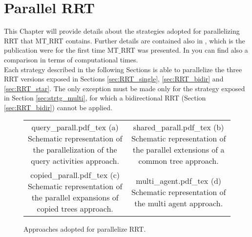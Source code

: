 \chapter{Parallel RRT}
\label{chap:parallel_RRT}

This Chapter will provide details about the strategies adopted for parallelizing RRT that MT$\_$RRT contains. Further details are contained also in \cite{MT_RRT}, which is the publication were for the first time MT$\_$RRT was presented. In \cite{MT_RRT} you can find also a comparison in terms of computational times.
\\
Each strategy described in the following Sections is able to parallelize the three RRT versions exposed in Sections \ref{sec:RRT_single}, \ref{sec:RRT_bidir} and \ref{sec:RRT_star}. The only exception must be made only for the strategy exposed in Section \ref{sec:strtg_multi}, for which a bidirectional RRT (Section \ref{sec:RRT_bidir}) cannot be applied.

 \begin{figure}
\begin{tabular}{cc}
\begin{minipage}[t]{0.49\textwidth}
 \def\svgwidth{0.69 \columnwidth}
 {query_parall.pdf_tex} 
 (a) Schematic representation of the parallelization of the query activities approach.
\end{minipage}
 &  
\begin{minipage}[t]{0.49\textwidth}
 \def\svgwidth{0.79 \columnwidth}
 {shared_parall.pdf_tex} 
 (b) Schematic representation of the parallel extensions of a common tree approach.
\end{minipage}
 \\
\begin{minipage}[t]{0.49\textwidth}
 \def\svgwidth{0.59 \columnwidth}
 {copied_parall.pdf_tex} 
 (c) Schematic representation of the parallel expansions of copied trees approach.
\end{minipage}
 & 
\begin{minipage}[t]{0.49\textwidth}
 \def\svgwidth{0.79 \columnwidth}
 {multi_agent.pdf_tex} 
 (d) Schematic representation of the multi agent approach. 
\end{minipage}
\end{tabular}
	 \caption{Approaches adopted for parallelize RRT.}
 \label{fig:parall_strategies}
\end{figure}

